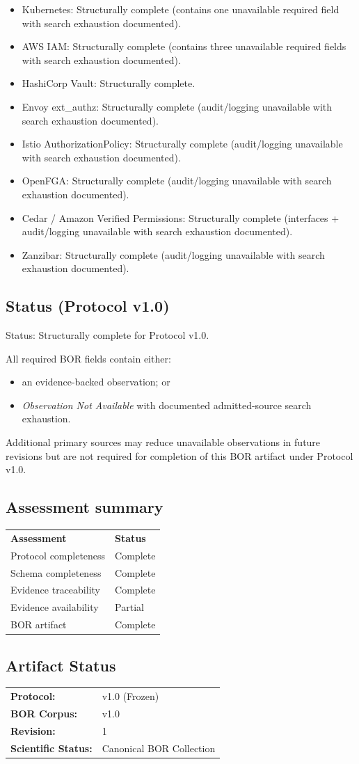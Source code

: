 \begin{itemize}
  \item Kubernetes: Structurally complete (contains one unavailable required field with search exhaustion documented).
  \item AWS IAM: Structurally complete (contains three unavailable required fields with search exhaustion documented).
  \item HashiCorp Vault: Structurally complete.
  \item Envoy ext\_authz: Structurally complete (audit/logging unavailable with search exhaustion documented).
  \item Istio AuthorizationPolicy: Structurally complete (audit/logging unavailable with search exhaustion documented).
  \item OpenFGA: Structurally complete (audit/logging unavailable with search exhaustion documented).
  \item Cedar / Amazon Verified Permissions: Structurally complete (interfaces + audit/logging unavailable with search exhaustion documented).
  \item Zanzibar: Structurally complete (audit/logging unavailable with search exhaustion documented).
\end{itemize}

\subsection*{Status (Protocol v1.0)}
Status: Structurally complete for Protocol v1.0.

All required BOR fields contain either:
\begin{itemize}
  \item an evidence-backed observation; or
  \item \emph{Observation Not Available} with documented admitted-source search exhaustion.
\end{itemize}

Additional primary sources may reduce unavailable observations in future revisions but are not required for completion of this BOR artifact under Protocol v1.0.

\subsection*{Assessment summary}
\begin{tabular}{@{}ll@{}}
\textbf{Assessment} & \textbf{Status}\\
Protocol completeness & Complete\\
Schema completeness & Complete\\
Evidence traceability & Complete\\
Evidence availability & Partial\\
BOR artifact & Complete\\
\end{tabular}

\subsection*{Artifact Status}
\begin{tabular}{@{}ll@{}}
\textbf{Protocol:} & v1.0 (Frozen)\\
\textbf{BOR Corpus:} & v1.0\\
\textbf{Revision:} & 1\\
\textbf{Scientific Status:} & Canonical BOR Collection\\
\end{tabular}
